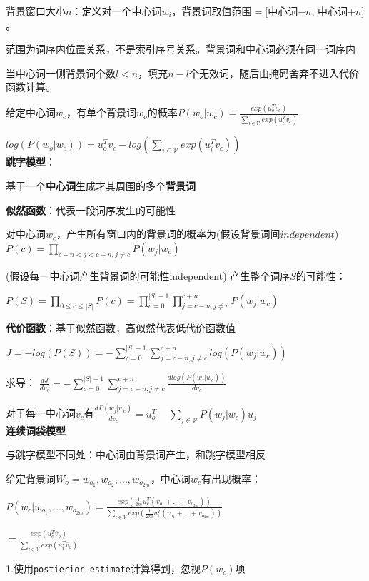 \documentclass[UTF8]{ctexart}
\begin{document}
  背景窗口大小$n$：定义对一个中心词$w_i$，背景词取值范围$=[$中心词$-n$, 中心词$+n]$。
  
  \quad 范围为词序内位置关系，不是索引序号关系。背景词和中心词必须在同一词序内

  \quad 当中心词一侧背景词个数$l<n$，填充$n-l$个无效词，随后由掩码舍弃不进入代价函数计算。

  给定中心词$w_c$，有单个背景词$w_o$的概率$P(w_o | w_c) = \frac{exp(u_o^Tv_c)}{\sum_{i\in\mathcal{V} } exp(u_i^Tv_c)}$
  
  \quad $ log(P(w_o | w_c)) = u_o^Tv_c - log(\sum_{i\in\mathcal{V} } exp(u_i^Tv_c))$\\
\textbf{跳字模型}：
  
  基于一个\textbf{中心词}生成才其周围的多个\textbf{背景词}

  \textbf{似然函数}：代表一段词序发生的可能性

  \quad 对中心词$w_c$，产生所有窗口内的背景词的概率为(假设背景词间$independent$)$P(c) = \prod_{c-n<j<c+n, j \neq c} P(w_j | w_c)$

  \quad (假设每一中心词产生背景词的可能性independent) 产生整个词序$S$的可能性：
  
  \quad \quad $P(S) = \prod_{0\leq c \leq |S|} P(c) = \prod_{c = 0}^{|S|-1} \prod_{j = c-n, j \neq c}^{c+n} P(w_j | w_c)$
  
  \textbf{代价函数}：基于似然函数，高似然代表低代价函数值

  \quad $J = -log(P(S)) = -\sum_{c = 0}^{|S|-1} \sum_{j = c-n, j \neq c}^{c+n} log(P(w_j | w_c))$
  
  \quad 求导： $\frac{d J}{d v_c} = -\sum_{c = 0}^{|S|-1} \sum_{j = c-n, j \neq c}^{c+n} \frac{d log(P(w_j | w_c))}{d v_c}$

  \quad \quad 对于每一中心词$v_c$有$\frac{d P(w_j | w_c)}{d v_c} = u_o^T - \sum_{j\in\mathcal{V}}P(w_j | w_c)u_j$\\
\textbf{连续词袋模型}

  与跳字模型不同处：中心词由背景词产生，和跳字模型相反

  给定背景词$W_o = w_{o_1}, w_{o_2}, ..., w_{o_{2m}}$，中心词$w_c$有出现概率：
  
  \quad $P(w_c | w_{o_1}, ..., w_{o_{2m}}) = \frac{exp(\frac{1}{2m}u_c^T(v_{o_1} + ... + v_{o_{2m}}))}{\sum_{i\in \mathcal{V} } exp(\frac{1}{2m}u_i^T(v_{o_1} + ... + v_{o_{2m}}))}$

  \quad \quad $= \frac{exp(u_c^T\bar{v}_o)}{\sum_{i\in \mathcal{V} } exp(u_i^T\bar{v}_o )}$

  \quad 1.使用\texttt{postierior estimate}计算得到，忽视$P(w_c)$项
\end{document}
